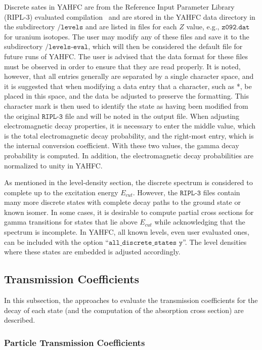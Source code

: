 \documentclass[
10pt,
showpacs,preprintnumbers,footinbib,
amsfonts,amsmath,amssymb,
aps,
prc,twocolumn,groupedaddress,superscriptaddress,
showkeys,
nofootinbib
]{revtex4-1}
\begin{document}
Discrete sates in YAHFC are from the Reference Input Parameter Library (RIPL-3) evaluated compilation~\cite{Capote:2009,RIPL-3} and are stored in the YAHFC data directory in the subdirectory ${\texttt{/levels}}$ and are listed in files for each $Z$ value, e.g., ${\texttt{z092.dat}}$ for uranium isotopes. The user may modify any of these files and save it to the subdirectory ${\texttt{/levels-eval}}$, which will then be considered the default file for future runs of YAHFC. The user is advised that the data format for these files must be observed in order to ensure that they are read properly. It is noted, however, that all entries generally are separated by a single character space, and it is suggested that when modifying a data entry that a character, such as *, be placed in this space, and the data be adjusted to preserve the formatting. This character mark is then used to identify the state as having been modified from the original ${\texttt{RIPL-3}}$ file and will be noted in the output file. When adjusting electromagnetic decay properties, it is necessary to enter the middle value, which is the total electromagnetic decay probability, and the right-most entry, which is the internal conversion coefficient. With these two values, the gamma decay probability is computed. In addition, the electromagnetic decay probabilities are normalized to unity in YAHFC.

As mentioned in the level-density section, the discrete spectrum is considered to complete up to the excitation energy $E_{cut}$. However, the ${\texttt{RIPL-3}}$ files contain many more discrete states with complete decay paths to the ground state or known isomer. In some cases, it is desirable to compute partial cross sections for gamma transitions for states that lie above $E_{cut}$ while acknowledging that the spectrum is incomplete. In YAHFC, all known levels, even user evaluated ones, can be included with the option ``${\texttt{all\_discrete\_states y}}$''. The level densities where these states are embedded is adjusted accordingly.

\subsection{Transmission Coefficients}

In this subsection, the approaches to evaluate the transmission coefficients for the decay of each state (and the computation of the absorption cross section) are described.

\subsubsection{Particle Transmission Coefficients}
\end{document}
